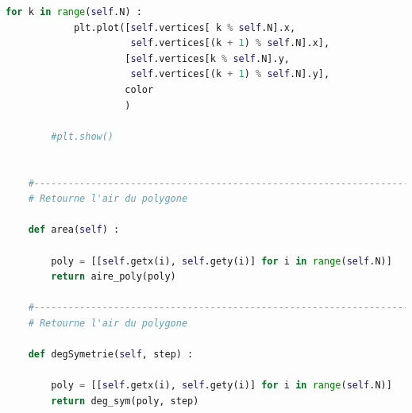 \documentclass[a4paper,reqno]{article}
\begin{document}
\begin{lstlisting}[language=Python,frame=single,caption=Création de la classe Polygon]
        for k in range(self.N) :
            plt.plot([self.vertices[ k % self.N].x,
                      self.vertices[(k + 1) % self.N].x],
                     [self.vertices[k % self.N].y,
                      self.vertices[(k + 1) % self.N].y],
                     color
                     )

        #plt.show()


    #---------------------------------------------------------------------
    # Retourne l'air du polygone

    def area(self) :

        poly = [[self.getx(i), self.gety(i)] for i in range(self.N)]
        return aire_poly(poly)

    #---------------------------------------------------------------------
    # Retourne l'air du polygone

    def degSymetrie(self, step) :

        poly = [[self.getx(i), self.gety(i)] for i in range(self.N)]
        return deg_sym(poly, step)


\end{lstlisting}
\end{document}
